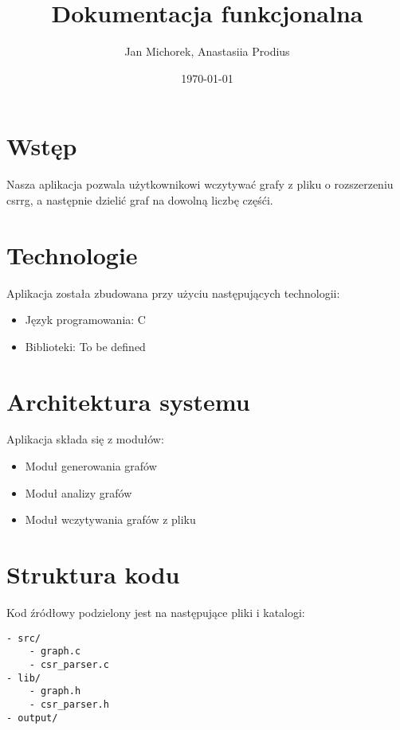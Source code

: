 \documentclass[a4paper,12pt]{article}
\title{Dokumentacja funkcjonalna}
\author{Jan Michorek, Anastasiia Prodius}
\date{\today}
\begin{document}
\maketitle

\tableofcontents

\section{Wstęp}
Nasza aplikacja pozwala użytkownikowi wczytywać grafy z pliku 
o rozszerzeniu csrrg, a następnie dzielić graf na dowolną liczbę częśći.

\section{Technologie}
Aplikacja została zbudowana przy użyciu następujących technologii:
\begin{itemize}
    \item Język programowania: C
    \item Biblioteki: To be defined 

\end{itemize}

\section{Architektura systemu}
Aplikacja składa się z modułów:
\begin{itemize}
    \item Moduł generowania grafów
    \item Moduł analizy grafów
    \item Moduł wczytywania grafów z pliku
\end{itemize}

\section{Struktura kodu}
Kod źródłowy podzielony jest na następujące pliki i katalogi:
\begin{verbatim}
- src/
    - graph.c
    - csr_parser.c
- lib/
    - graph.h
    - csr_parser.h
- output/
\end{verbatim}
\end{document}
